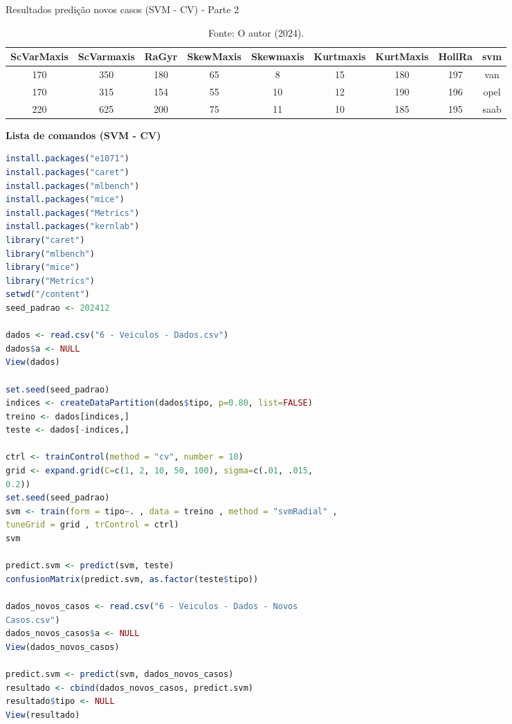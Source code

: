 \begin{table}[H]
\caption{Resultados predição novos casos (SVM - CV) - Parte 2 }
\hspace*{-2.5cm} %
\begin{minipage}{\textwidth}
\centering
\begin{tabular}{|c|c|c|c|c|c|c|c|c|}
\hline
ScVarMaxis & ScVarmaxis & RaGyr & SkewMaxis & Skewmaxis & Kurtmaxis & KurtMaxis & HollRa & svm \\
\hline
170 & 350 & 180 & 65 & 8  & 15 & 180 & 197 & van \\
\hline
170 & 315 & 154 & 55 & 10 & 12 & 190 & 196 & opel \\
\hline
220 & 625 & 200 & 75 & 11 & 10 & 185 & 195 & saab \\
\hline
\end{tabular}
\end{minipage}
\caption*{Fonte: O autor (2024).}
\end{table}


\begin{center}
    \textbf{Lista de comandos (SVM - CV)}
\end{center}

\begin{lstlisting}[language=R, style=input]
install.packages("e1071")
install.packages("caret")
install.packages("mlbench")
install.packages("mice")
install.packages("Metrics")
install.packages("kernlab")
library("caret")
library("mlbench")
library("mice")
library("Metrics")
setwd("/content")
seed_padrao <- 202412

dados <- read.csv("6 - Veiculos - Dados.csv")
dados$a <- NULL
View(dados)

set.seed(seed_padrao)
indices <- createDataPartition(dados$tipo, p=0.80, list=FALSE)
treino <- dados[indices,]
teste <- dados[-indices,]

ctrl <- trainControl(method = "cv", number = 10)
grid <- expand.grid(C=c(1, 2, 10, 50, 100), sigma=c(.01, .015,
0.2))
set.seed(seed_padrao)
svm <- train(form = tipo~. , data = treino , method = "svmRadial" ,
tuneGrid = grid , trControl = ctrl)
svm

predict.svm <- predict(svm, teste)
confusionMatrix(predict.svm, as.factor(teste$tipo))

dados_novos_casos <- read.csv("6 - Veiculos - Dados - Novos
Casos.csv")
dados_novos_casos$a <- NULL
View(dados_novos_casos)

predict.svm <- predict(svm, dados_novos_casos)
resultado <- cbind(dados_novos_casos, predict.svm)
resultado$tipo <- NULL
View(resultado)
\end{lstlisting}


